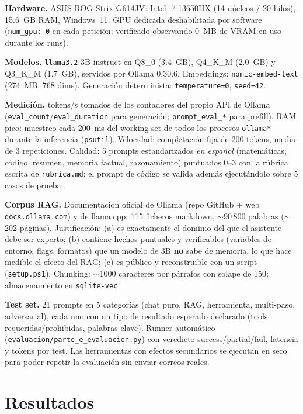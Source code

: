 \documentclass[conference]{IEEEtran}
\begin{document}
\textbf{Hardware.} ASUS ROG Strix G614JV: Intel i7-13650HX (14 núcleos /
20 hilos), 15.6~GB RAM, Windows~11. GPU dedicada deshabilitada por software
(\texttt{num\_gpu:~0} en cada petición; verificado observando 0~MB de VRAM en
uso durante los runs).

\textbf{Modelos.} \texttt{llama3.2} 3B instruct en Q8\_0 (3.4~GB), Q4\_K\_M
(2.0~GB) y Q3\_K\_M (1.7~GB), servidos por Ollama 0.30.6. Embeddings:
\texttt{nomic-embed-text} (274~MB, 768 dims). Generación determinista:
\texttt{temperature=0}, \texttt{seed=42}.

\textbf{Medición.} tokens/s tomados de los contadores del propio API de Ollama
(\texttt{eval\_count}/\texttt{eval\_duration} para generación;
\texttt{prompt\_eval\_*} para prefill). RAM pico: muestreo cada 200~ms del
working-set de todos los procesos \texttt{ollama*} durante la inferencia
(\texttt{psutil}). Velocidad: completación fija de 200 tokens, media de 3
repeticiones. Calidad: 5 prompts estandarizados \emph{en español}
(matemáticas, código, resumen, memoria factual, razonamiento) puntuados 0--3
con la rúbrica escrita de \texttt{rubrica.md}; el prompt de código se valida
además ejecutándolo sobre 5 casos de prueba.

\textbf{Corpus RAG.} Documentación oficial de Ollama (repo GitHub + web
\texttt{docs.ollama.com}) y de llama.cpp: 115 ficheros markdown, $\sim$90\,800
palabras ($\sim$202 páginas). Justificación: (a) es exactamente el dominio del
que el asistente debe ser experto; (b) contiene hechos puntuales y verificables
(variables de entorno, flags, formatos) que un modelo de 3B \textbf{no} sabe de
memoria, lo que hace medible el efecto del RAG; (c) es público y reconstruible
con un script (\texttt{setup.ps1}). Chunking: $\sim$1000 caracteres por párrafos
con solape de 150; almacenamiento en \texttt{sqlite-vec}.

\textbf{Test set.} 21 prompts en 5 categorías (chat puro, RAG, herramienta,
multi-paso, adversarial), cada uno con un tipo de resultado esperado declarado
(tools requeridas/prohibidas, palabras clave). Runner automático
(\texttt{evaluacion/parte\_e\_evaluacion.py}) con veredicto
success/partial/fail, latencia y tokens por test. Las herramientas con efectos
secundarios se ejecutan en seco para poder repetir la evaluación sin enviar
correos reales.

\section{Resultados}
\end{document}
